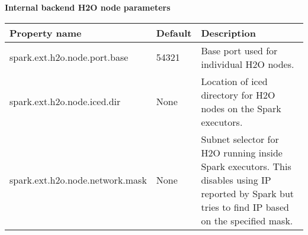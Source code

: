 \textbf{Internal backend H2O node parameters}
\begin{footnotesize}
\begin{longtable}[!ht]{l p{3.0cm} p{3.0cm}}
\toprule
Property name & Default & Description \\
\midrule

spark.ext.h2o.node.port.base & 54321 & Base port used for individual H2O nodes. \\ \addlinespace

spark.ext.h2o.node.iced.dir & None & Location of iced directory for H2O nodes on the Spark executors. \\ \addlinespace

spark.ext.h2o.node.network.mask & None & Subnet selector for H2O running inside Spark executors. This disables using IP reported by Spark but tries to find IP based on the specified mask. \\

\bottomrule
\end{longtable}
\end{footnotesize}



